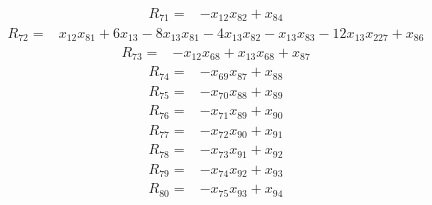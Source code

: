 \begin{equation*}\begin{split}
R_{71}={}&-x_{12} x_{82} + x_{84}
\end{split}\end{equation*}
\begin{equation*}\begin{split}
R_{72}={}&x_{12} x_{81} + 6x_{13} - 8x_{13} x_{81} - 4x_{13} x_{82} - x_{13} x_{83} - 12x_{13} x_{227} + x_{86}
\end{split}\end{equation*}
\begin{equation*}\begin{split}
R_{73}={}&-x_{12} x_{68} + x_{13} x_{68} + x_{87}
\end{split}\end{equation*}
\begin{equation*}\begin{split}
R_{74}={}&-x_{69} x_{87} + x_{88}
\end{split}\end{equation*}
\begin{equation*}\begin{split}
R_{75}={}&-x_{70} x_{88} + x_{89}
\end{split}\end{equation*}
\begin{equation*}\begin{split}
R_{76}={}&-x_{71} x_{89} + x_{90}
\end{split}\end{equation*}
\begin{equation*}\begin{split}
R_{77}={}&-x_{72} x_{90} + x_{91}
\end{split}\end{equation*}
\begin{equation*}\begin{split}
R_{78}={}&-x_{73} x_{91} + x_{92}
\end{split}\end{equation*}
\begin{equation*}\begin{split}
R_{79}={}&-x_{74} x_{92} + x_{93}
\end{split}\end{equation*}
\begin{equation*}\begin{split}
R_{80}={}&-x_{75} x_{93} + x_{94}
\end{split}\end{equation*}
